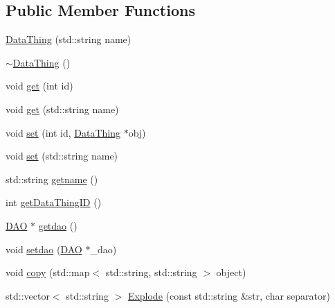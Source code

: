 \subsection*{Public Member Functions}
\begin{DoxyCompactItemize}
\item 
\hyperlink{class_data_thing_a0f24c5c1cf6892915fd4e3693dac1527}{DataThing} (std::string name)
\item 
\hyperlink{class_data_thing_aab4d5d9564759368729fc7f0261e7036}{$\sim$DataThing} ()
\item 
void \hyperlink{class_data_thing_a8d294fdb8263e02e911e429aa79e8ec0}{get} (int id)
\item 
void \hyperlink{class_data_thing_ac2eac975c5f135baa984906b073920e8}{get} (std::string name)
\item 
void \hyperlink{class_data_thing_a241184e8e43c0c2e5ced27ebc0858f0f}{set} (int id, \hyperlink{class_data_thing}{DataThing} $\ast$obj)
\item 
void \hyperlink{class_data_thing_a2e3a079dcb519fa810f2d6412ba90cd3}{set} (std::string name)
\item 
std::string \hyperlink{class_data_thing_af283145e771ef8a47c853ceed4a9f963}{getname} ()
\item 
int \hyperlink{class_data_thing_a8b3d94cd97dda258c626e5851fa0cbe0}{getDataThingID} ()
\item 
\hyperlink{class_d_a_o}{DAO} $\ast$ \hyperlink{class_data_thing_ae405347375d1a67fc132f200e74637d3}{getdao} ()
\item 
void \hyperlink{class_data_thing_af13c3ba6fa5e679aaa245e22b8d16e13}{setdao} (\hyperlink{class_d_a_o}{DAO} $\ast$\_\-dao)
\item 
void \hyperlink{class_data_thing_a6d3f72340c760ce2d464fdca61a85633}{copy} (std::map$<$ std::string, std::string $>$ object)
\item 
std::vector$<$ std::string $>$ \hyperlink{class_data_thing_ad0bf28e66a55089ee19dd2a92b71244f}{Explode} (const std::string \&str, char separator)
\end{DoxyCompactItemize}


